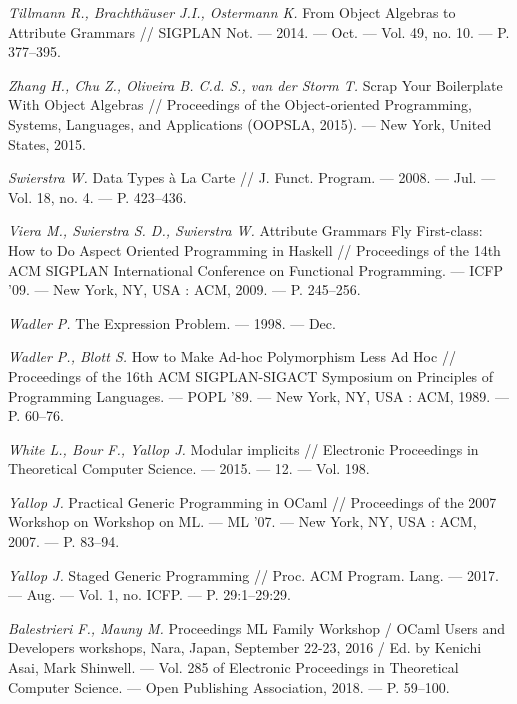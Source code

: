 \begin{thebibliography}{99}
{\em Tillmann R., Brachth\"auser J.I., Ostermann K. } From Object Algebras to Attribute Grammars //
 SIGPLAN Not. — 2014. — Oct. — Vol. 49, no. 10. — P. 377–395. 

{\em Zhang H., Chu Z.,  Oliveira B. C.d. S., van der Storm T.}
Scrap Your Boilerplate With Object Algebras  // Proceedings of the Object-oriented Programming, Systems, Languages, and
 Applications (OOPSLA, 2015). — New York, United States, 2015. %

{\em Swierstra W.} Data Types \`a La Carte // J. Funct. Program. —
 2008. — Jul. — Vol. 18, no. 4. — P. 423–436.

{\em Viera M., Swierstra S. D., Swierstra W.} Attribute
 Grammars Fly First-class: How to Do Aspect Oriented 
 Program\-ming in Haskell // Proceedings of the 14th ACM SIGPLAN 
 In\-ternational Conference on Functional Programming. — ICFP ’09. —
 New York, NY, USA : ACM, 2009. — P. 245–256. 

{\em Wadler P.} The Expression Problem. — 1998. — Dec.
 
{\em Wadler P., Blott S.} How to Make Ad-hoc Polymorphism Less Ad
 Hoc // Proceedings of the 16th ACM SIGPLAN-SIGACT Symposium on Principles of Programming Languages. — POPL ’89. — New
 York, NY, USA : ACM, 1989. — P. 60–76. 

{\em White L., Bour F., Yallop J.} Modular implicits // Electronic Proceedings in Theoretical Computer Science. — 2015. — 12. —
 Vol. 198.
 
{\em Yallop J.} Practical Generic Programming in OCaml // Proceedings of the 2007 Workshop on Workshop on ML. — ML ’07. —
 New York, NY, USA : ACM, 2007. — P. 83–94. 

{\em  Yallop J.} Staged Generic Programming // Proc. ACM Program. Lang. — 2017. — Aug. — Vol. 1, no. ICFP. — P. 29:1–29:29. 

{\em  Balestrieri F., Mauny M.} Proceedings ML Family Workshop / OCaml Users and Developers
workshops, Nara, Japan, September 22-23, 2016 / Ed. by Kenichi Asai,
Mark Shinwell. — Vol. 285 of Electronic Proceedings in Theoretical
Computer Science. — Open Publishing Association, 2018. — P. 59–100.


\end{thebibliography}
